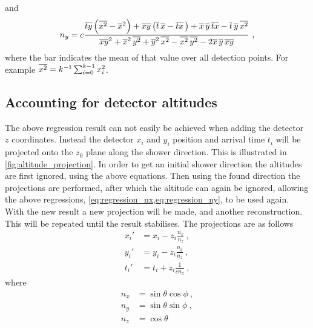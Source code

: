 %
and
%
\begin{equation}\label{eq:regression_ny}
    n_y = c \frac{\overline{t y} \left( \overline{x^2} - \overline{x}^2 \right) +
                  \overline{x y} \left( \overline{t} \, \overline{x} - \overline{t x} \, \right) +
                  \overline{x} \, \overline{y} \, \overline{t x} -
                  \overline{t} \, \overline{y} \, \overline{x^2}}
                 {\overline{x y}^2 + \overline{x}^2 \, \overline{y^2} +
                  \overline{y}^2 \, \overline{x^2} - \overline{x^2} \, \overline{y^2} -
                  2 \overline{x} \, \overline{y} \, \overline{x y}} \ ,
\end{equation}
%
where the bar indicates the mean of that value over all detection points. For example $\overline{x^2} = k^{-1} \sum_{i = 0}^{k - 1} x_i^2$.


\subsection{Accounting for detector altitudes}

The above regression result can not easily be achieved when adding the detector $z$ coordinates. Instead the detector $x_i$ and $y_i$ position and arrival time $t_i$ will be projected onto the $z_0$ plane along the shower direction. This is illustrated in \cref{fig:altitude_projection}. In order to get an initial shower direction the altitudes are first ignored, using the above equations. Then using the found direction the projections are performed, after which the altitude can again be ignored, allowing the above regressions, \cref{eq:regression_nx,eq:regression_ny}, to be used again. With the new result a new projection will be made, and another reconstruction. This will be repeated until the result stabilises. The projections are as follows
%
\begin{equation}
    \begin{aligned}
        x_i' &= x_i - z_i \frac{n_x}{n_z} \ , \\
        y_i' &= y_i - z_i \frac{n_y}{n_z} \ , \\
        t_i' &= t_i + z_i \frac{1}{c n_z} \ ,
    \end{aligned}
\end{equation}
%
where
%
\begin{equation}
    \begin{aligned}
        n_x &= \sin \theta \cos \phi \ , \\
        n_y &= \sin \theta \sin \phi \ , \\
        n_z &= \cos \theta
    \end{aligned}
\end{equation}
%

